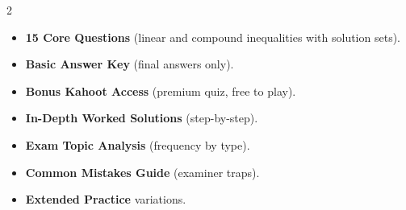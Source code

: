 \documentclass[11pt,a4paper]{article}
\newcommand{\FullReleaseDate}{April 30, 2026}
\begin{document}
\vspace{8pt}

\begin{multicols}{2}
  \begin{tcolorbox}[card, title=\sffamily\bfseries\textcolor{white}{\faHandPointDown\ TODAY (Simplified Version)}, colbacktitle=mainblue, boxed title style={sharp corners, boxrule=0pt}]
    \begin{itemize}[leftmargin=1.2em, itemsep=2pt]
      \item \small \textbf{15 Core Questions} (linear and compound inequalities with solution sets).
      \item \small \textbf{Basic Answer Key} (final answers only).
      \item \small \textbf{Bonus Kahoot Access} (premium quiz, free to play).
    \end{itemize}
  \end{tcolorbox}

  \columnbreak

  \begin{tcolorbox}[card, title=\sffamily\bfseries\textcolor{white}{\faRocket\ ON \FullReleaseDate\ (Full Upgrade)}, colbacktitle=mainblue, boxed title style={sharp corners, boxrule=0pt}]
    \begin{itemize}[leftmargin=1.2em, itemsep=2pt]
      \item \small \textbf{In-Depth Worked Solutions} (step-by-step).
      \item \small \textbf{Exam Topic Analysis} (frequency by type).
      \item \small \textbf{Common Mistakes Guide} (examiner traps).
      \item \small \textbf{Extended Practice} variations.
    \end{itemize}
  \end{tcolorbox}
\end{multicols}
\end{document}
